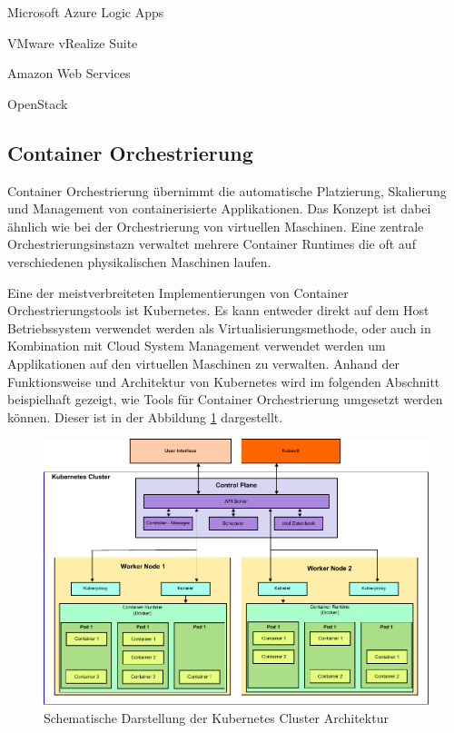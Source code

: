 Microsoft Azure Logic Apps

VMware vRealize Suite

Amazon Web Services

OpenStack



\subsection{Container Orchestrierung}

Container Orchestrierung übernimmt die automatische Platzierung, Skalierung und Management von containerisierte Applikationen. Das Konzept ist dabei ähnlich wie bei der Orchestrierung von virtuellen Maschinen. Eine zentrale Orchestrierungsinstazn verwaltet mehrere Container Runtimes die oft auf verschiedenen physikalischen Maschinen laufen.

Eine der meistverbreiteten Implementierungen von Container Orchestrierungstools ist Kubernetes. Es kann entweder direkt auf dem Host Betriebssystem verwendet werden als Virtualisierungsmethode, oder auch in Kombination mit Cloud System Management verwendet werden um Applikationen auf den virtuellen Maschinen zu verwalten. Anhand der Funktionsweise und Architektur von Kubernetes wird im folgenden Abschnitt beispielhaft gezeigt, wie Tools für Container Orchestrierung umgesetzt werden können. Dieser ist in der Abbildung \ref{kubernetes_arch} dargestellt.

\begin{figure}
	\centering
	\includegraphics[width=\textwidth]{./content/graphics/kubernetes_arch.pdf}
	\caption{Schematische Darstellung der Kubernetes Cluster Architektur}
	\label{kubernetes_arch}
\end{figure}

